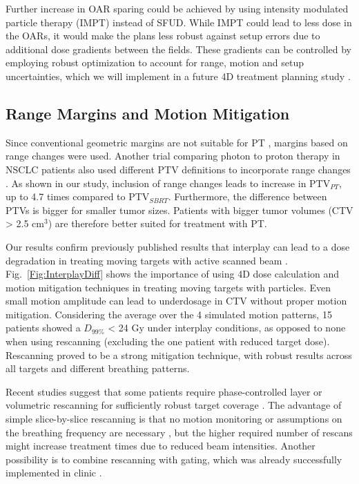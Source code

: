 Further increase in OAR sparing could be achieved by using intensity modulated particle therapy (IMPT) instead of SFUD. 
While IMPT could lead to less dose in the OARs, it would make the plans less robust against setup errors due to 
additional dose gradients between the fields. These gradients can be controlled by employing robust optimization to 
account for range, motion and setup uncertainties, which we will implement in a future 4D treatment 
planning study \cite{Chen2012, Graeff2014}.



\subsection{Range Margins and Motion Mitigation}

Since conventional geometric margins are not suitable for PT \cite{Park2012}, margins based on range changes were used. Another trial comparing photon to proton therapy in NSCLC patients also used different PTV definitions to incorporate 
range changes \cite{Roelofs2012}. As shown in our study, inclusion of range changes leads to increase in PTV$_{PT}$, up to 4.7 times compared to PTV$_{SBRT}$. 
Furthermore, the difference between PTVs is bigger for smaller tumor sizes. Patients with bigger tumor volumes (CTV > 2.5 cm$^{3}$) are therefore better suited for treatment with PT. 

Our results confirm previously published results that interplay can lead to a dose degradation in treating moving targets with active scanned beam \cite{Bert2008}. 
Fig.~\ref{Fig:InterplayDiff} shows the importance of using 4D dose calculation and motion mitigation techniques in treating moving targets with particles. 
Even small motion amplitude can lead to underdosage in CTV without proper motion mitigation. Considering the average over the 4 simulated motion patterns, 15 patients showed a $D_{99\%}$ < 24 Gy under interplay 
conditions, as opposed to none when using rescanning (excluding the one patient with reduced target dose). Rescanning proved to be a strong mitigation technique, with robust results across all targets and different breathing patterns.

Recent studies suggest that some patients require phase-controlled layer or volumetric rescanning for sufficiently robust target coverage \cite{Mori2013,Takahashi2014}. 
The advantage of simple slice-by-slice rescanning is that no motion monitoring or assumptions on the breathing frequency are necessary \cite{Bert2011}, but the higher required number of rescans 
might increase treatment times due to reduced beam intensities. Another possibility is to combine rescanning with gating, which was already successfully implemented in clinic \cite{Rossi2016}.




